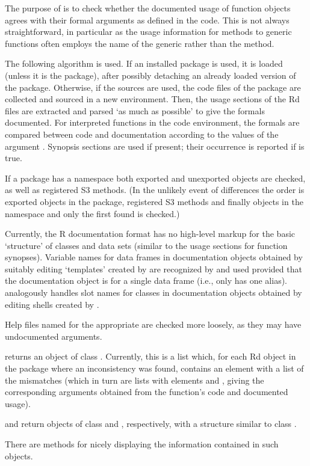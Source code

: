 %
\begin{Details}\relax
The purpose of  is to check whether the documented usage
of function objects agrees with their formal arguments as defined in
the \R{} code.  This is not always straightforward, in particular as the
usage information for methods to generic functions often employs the
name of the generic rather than the method.

The following algorithm is used.  If an installed package is used, it
is loaded (unless it is the  package), after possibly
detaching an already loaded version of the package.  Otherwise, if the
sources are used, the \R{} code files of the package are collected and
sourced in a new environment.  Then, the usage sections of the Rd
files are extracted and parsed `as much as possible' to give
the formals documented.  For interpreted functions in the code
environment, the formals are compared between code and documentation
according to the values of the argument .  Synopsis
sections are used if present; their occurrence is reported if
 is true.

If a package has a namespace both exported and unexported objects are
checked, as well as registered S3 methods.  (In the unlikely event of
differences the order is exported objects in the package, registered
S3 methods and finally objects in the namespace and only the first
found is checked.)

Currently, the R documentation format has no high-level markup for the
basic `structure' of classes and data sets (similar to the usage
sections for function synopses).  Variable names for data frames in
documentation objects obtained by suitably editing `templates'
created by  are recognized by 
and used provided that the documentation object is for a single data
frame (i.e., only has one alias).   analogously
handles slot names for classes in documentation objects obtained by
editing shells created by .

Help files named  for the
appropriate  are checked more loosely, as they may
have undocumented arguments.
\end{Details}
%
\begin{Value}
 returns an object of class .  Currently,
this is a list which, for each Rd object in the package where an
inconsistency was found, contains an element with a list of the
mismatches (which in turn are lists with elements  and
, giving the corresponding arguments obtained from the
function's code and documented usage).

 and  return objects of class
 and , respectively, with a
structure similar to class .

There are  methods for nicely displaying the information
contained in such objects.
\end{Value}
